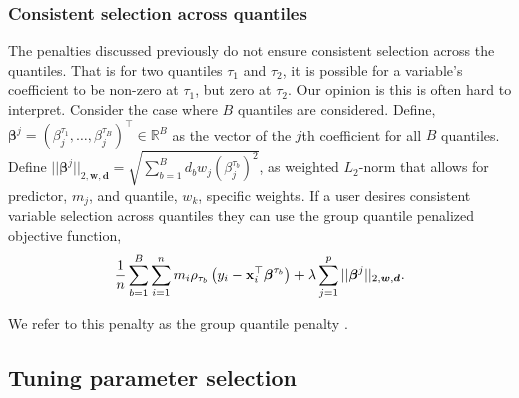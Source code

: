 \subsubsection{Consistent selection across quantiles}\label{consistent-selection-across-quantiles}

The penalties discussed previously do not ensure consistent selection across the quantiles. That is for two quantiles \(\tau_1\) and \(\tau_2\), it is possible for a variable's coefficient to be non-zero at \(\tau_1\), but zero at \(\tau_2\). Our opinion is this is often hard to interpret. Consider the case where \(B\) quantiles are considered. Define, \(\boldsymbol \beta^j = (\beta_{j}^{\tau_1},\ldots,\beta^{\tau_B}_j)^\top \in \mathbb{R}^{B}\) as the vector of the \(j\)th coefficient for all \(B\) quantiles. Define \(||\boldsymbol \beta^j||_{2,\boldsymbol w,\boldsymbol d}=\sqrt{\sum_{b=1}^B d_b w_j (\beta^{\tau_b}_{j})^2}\), as weighted \(L_2\)-norm that allows for predictor, \(m_j\), and quantile, \(w_k\), specific weights. If a user desires consistent variable selection across quantiles they can use the group quantile penalized objective function,
\begin{equation}
\frac{1}{n} \sum_{b=1}^B \sum_{i=1}^n m_i \rho_{\tau_b}\left(y_i - {\bf x}_i^\top\boldsymbol \beta^{\tau_b}\right) + \lambda \sum_{j=1}^p ||\boldsymbol \beta^j||_{2,\boldsymbol w,\boldsymbol d}.
\label{eq:gql}
\end{equation}

We refer to this penalty as the group quantile penalty \citep{gqlasso}.

\subsection{Tuning parameter selection}\label{tuning-parameter-selection}

